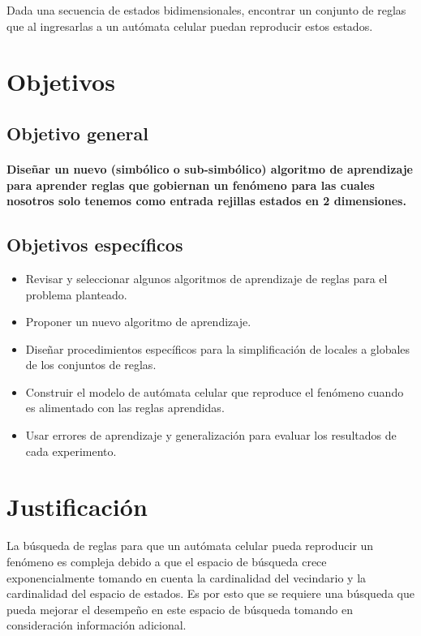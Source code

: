 Dada una secuencia de estados bidimensionales, encontrar un conjunto de reglas que al ingresarlas a un autómata celular puedan reproducir estos estados.

\section{Objetivos}
%
\subsection{Objetivo general}
\noindent \paragraph{Diseñar un nuevo (simbólico o sub-simbólico) algoritmo de aprendizaje para aprender reglas que gobiernan un fenómeno para las cuales nosotros solo tenemos como entrada rejillas estados en 2 dimensiones.}

\subsection{Objetivos específicos}
\begin{itemize}
\item Revisar y seleccionar algunos algoritmos de aprendizaje de reglas para el problema planteado.
\item Proponer un nuevo algoritmo de aprendizaje.
\item Diseñar procedimientos específicos para la simplificación de locales a globales de los conjuntos de reglas.
\item Construir el modelo de autómata celular que reproduce el fenómeno cuando es alimentado con las reglas aprendidas.
\item Usar errores de aprendizaje y generalización para evaluar los resultados de cada experimento. 
\end{itemize}

\section{Justificación}
La búsqueda de reglas para que un autómata celular pueda reproducir un fenómeno es compleja debido a que el espacio de búsqueda crece exponencialmente tomando en cuenta la cardinalidad del vecindario y la cardinalidad del espacio de estados. Es por esto que se requiere una búsqueda que pueda mejorar el desempeño en este espacio de búsqueda tomando en consideración información adicional.

